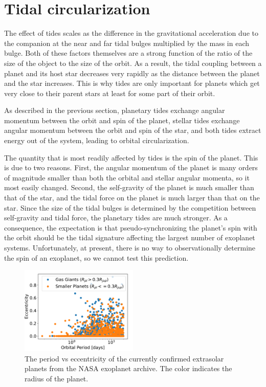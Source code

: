 \section{Tidal circularization}
%
\label{sec:synchronization_circularization_alignment}

The effect of tides scales as the difference in the gravitational acceleration
due to the companion at the near and far tidal bulges multiplied by the mass in
each bulge. Both of these factors themselves are a strong function of the ratio
of the size of the object to the size of the orbit. As a result, the tidal
coupling between a planet and its host star decreases very rapidly as the
distance between the planet and the star increases. This is why tides are only
important for planets which get very close to their parent stars at least for
some part of their orbit.

As described in the previous section, planetary tides exchange angular
momentum between the orbit and spin of the planet, stellar tides exchange
angular momentum between the orbit and spin of the star, and both tides extract
energy out of the system, leading to orbital circularization.

The quantity that is most readily affected by tides is the spin of the planet.
This is due to two reasons. First, the angular momentum of the planet is many
orders of magnitude smaller than both the orbital and stellar angular momenta,
so it most easily changed. Second, the self-gravity of the planet is much smaller
than that of the star, and the tidal force on the planet is much larger than
that on the star. Since the size of the tidal bulges is determined by the
competition between self-gravity and tidal force, the planetary tides are much
stronger. As a consequence, the expectation is that pseudo-synchronizing the
planet's spin with the orbit should be the tidal signature affecting the largest
number of exoplanet systems. Unfortunately, at present, there is no way to
observationally determine the spin of an exoplanet, so we cannot test this
prediction.

\begin{figure}[t]
%
    \centering
%
    \includegraphics[width=0.5\textwidth]{period_eccentricity.pdf}
%
    \caption{
%
        The period vs eccentricity of the currently confirmed extrasolar planets
        from the NASA exoplanet archive. The color indicates the radius of the
        planet.
%
    }
%
    \label{fig:period-eccentricity}
%
\end{figure}

